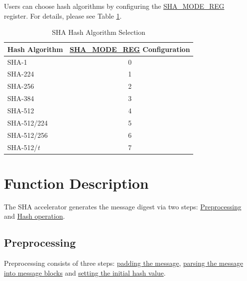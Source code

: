 \documentclass[main\_\_EN.tex]{subfiles}
\begin{document}
Users can choose hash algorithms by configuring the \hyperref[regdesc:SHAMODEREG]{SHA\_MODE\_REG} register. For details, please see Table \ref{tab:sha-mode-summ}.

\begin{longtable}[c]{| l | c |}
\caption{SHA Hash Algorithm Selection}
\label{tab:sha-mode-summ}
\\\hline
\rowcolor{lightgray}
\textbf{Hash Algorithm} & \textbf{\hyperref[regdesc:SHAMODEREG]{SHA\_MODE\_REG} Configuration}\\\hline
    SHA-1               & 0 \\\hline
    SHA-224             & 1 \\\hline
    SHA-256             & 2 \\\hline
    SHA-384             & 3 \\\hline
    SHA-512             & 4 \\\hline
    SHA-512/224         & 5 \\\hline
    SHA-512/256         & 6 \\\hline
    SHA-512/{\it{t}}    & 7 \\\hline
\end{longtable}



\section{Function Description}

The SHA accelerator generates the message digest via two steps: \hyperref[sec:sha-preprocessing]{Preprocessing} and  \hyperref[sec:sha-hash-operation]{Hash operation}.

\subsection{Preprocessing}\label{sec:sha-preprocessing}

Preprocessing consists of three steps: \hyperref[sec:sha-text-padding]{padding the message}, \hyperref[sec:sha-parsing-message]{parsing the message into message blocks} and \hyperref[sec:sha-initial-hash]{setting the initial hash value}.
\end{document}
